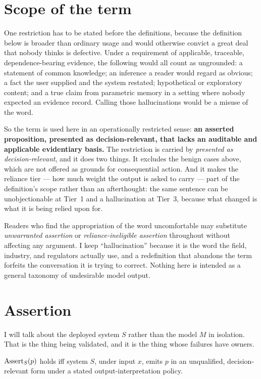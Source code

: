 \section{Scope of the term}
\label{sec:hall-scope}

One restriction has to be stated before the definitions, because the definition below is
broader than ordinary usage and would otherwise convict a great deal that nobody thinks
is defective. Under a requirement of applicable, traceable, dependence-bearing evidence,
the following would all count as ungrounded: a statement of common knowledge; an
inference a reader would regard as obvious; a fact the user supplied and the system
restated; hypothetical or exploratory content; and a true claim from parametric memory
in a setting where nobody expected an evidence record. Calling those hallucinations
would be a misuse of the word.

So the term is used here in an operationally restricted sense: \textbf{an asserted
proposition, presented as decision-relevant, that lacks an auditable and applicable
evidentiary basis.} The restriction is carried by \emph{presented as
decision-relevant}, and it does two things. It excludes the benign cases above, which
are not offered as grounds for consequential action. And it makes the reliance tier ---
how much weight the output is asked to carry --- part of the definition's scope
rather than an afterthought: the
same sentence can be unobjectionable at Tier~1 and a hallucination at Tier~3, because
what changed is what it is being relied upon for.

Readers who find the appropriation of the word uncomfortable may substitute
\emph{unwarranted assertion} or \emph{reliance-ineligible assertion} throughout without
affecting any argument. I keep ``hallucination'' because it is the word the field,
industry, and regulators actually use, and a redefinition that abandons the term
forfeits the conversation it is trying to correct. Nothing here is intended as a general
taxonomy of undesirable model output.

\section{Assertion}

I will talk about the deployed system $S$ rather than the model $M$ in isolation.
That is the thing being validated, and it is the thing whose failures have owners.

\begin{definition}[Assertion]
\label{def:assertion}
$\operatorname{Assert}_S(p)$ holds iff system $S$, under input $x$, emits $p$ in an unqualified,
decision-relevant form under a stated output-interpretation policy.
\end{definition}

